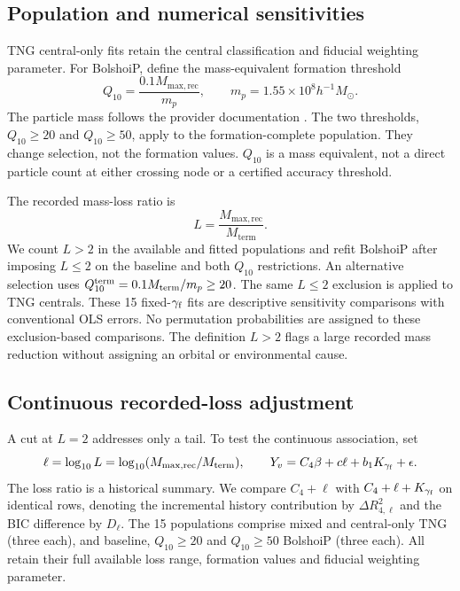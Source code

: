 \documentclass[11pt,a4paper]{article}
\newcommand{\Mrec}{M_{\mathrm{max,rec}}}
\newcommand{\Mterm}{M_{\mathrm{term}}}
\begin{document}
\subsection{Population and numerical sensitivities}\label{sec:sensitivity_design}
TNG central-only fits retain the central classification and fiducial weighting parameter. For BolshoiP, define the mass-equivalent formation threshold
\begin{equation}
Q_{10}=\frac{0.1\Mrec}{m_p},\qquad m_p=1.55\times10^8h^{-1}M_\odot.\label{eq:Q}
\end{equation}
The particle mass follows the provider documentation \citep{TAO}. The two thresholds, $Q_{10}\geq20$ and $Q_{10}\geq50$, apply to the formation-complete population. They change selection, not the formation values. $Q_{10}$ is a mass equivalent, not a direct particle count at either crossing node or a certified accuracy threshold.

The recorded mass-loss ratio is
\begin{equation}
L=\frac{\Mrec}{\Mterm}.\label{eq:loss}
\end{equation}
We count $L>2$ in the available and fitted populations and refit BolshoiP after imposing $L\leq2$ on the baseline and both $Q_{10}$ restrictions. An alternative selection uses $Q_{10}^{\rm term}=0.1\Mterm/m_p\geq20$. The same $L\leq2$ exclusion is applied to TNG centrals. These 15 fixed-$\gamma_{\rm f}$ fits are descriptive sensitivity comparisons with conventional OLS errors. No permutation probabilities are assigned to these exclusion-based comparisons. The definition $L>2$ flags a large recorded mass reduction without assigning an orbital or environmental cause.




\subsection{Continuous recorded-loss adjustment}\label{sec:logloss_design}
A cut at $L=2$ addresses only a tail. To test the continuous association, set
\begin{equation}
\ell=\log_{10}L=\log_{10}(\Mrec/\Mterm),\qquad
Y_v=C_4\beta+c\ell+b_1K_{\gamma_{\rm f}}+\epsilon.\label{eq:logloss}
\end{equation}
The loss ratio is a historical summary. We compare $C_4+\ell$ with $C_4+\ell+K_{\gamma_{\rm f}}$ on identical rows, denoting the incremental history contribution by $\Delta R^2_{4,\ell}$ and the BIC difference by $D_\ell$. The 15 populations comprise mixed and central-only TNG (three each), and baseline, $Q_{10}\geq20$ and $Q_{10}\geq50$ BolshoiP (three each). All retain their full available loss range, formation values and fiducial weighting parameter.
\end{document}
